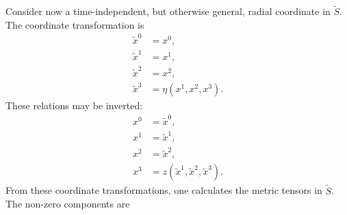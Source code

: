 \documentclass{article}
\begin{document}
Consider now a time-independent, but otherwise general, radial coordinate in $\tilde{S}$. The coordinate transformation is
\begin{align}
\tilde{x}^0&=x^0, \\
\tilde{x}^1&=x^1, \\
\tilde{x}^2&=x^2, \\
\tilde{x}^3&=\eta(x^1,x^2,x^3).
\end{align}
These relations may be inverted:
\begin{align}
x^0&=\tilde{x}^0, \\
x^1&=\tilde{x}^1, \\
x^2&=\tilde{x}^2, \\
x^3&=z(\tilde{x}^1,\tilde{x}^2,\tilde{x}^3).
\end{align}
From these coordinate transformations, one calculates the metric tensors in $\tilde{S}$. The non-zero components are
\end{document}
